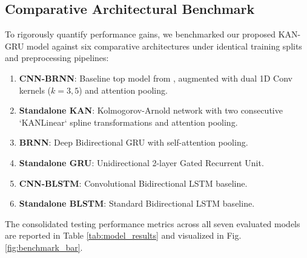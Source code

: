 \documentclass[conference]{IEEEtran}
\begin{document}
\subsection{Comparative Architectural Benchmark}
To rigorously quantify performance gains, we benchmarked our proposed KAN-GRU model against six comparative architectures under identical training splits and preprocessing pipelines:
\begin{enumerate}
    \item \textbf{CNN-BRNN}: Baseline top model from \cite{ieee11308890}, augmented with dual 1D Conv kernels ($k=3, 5$) and attention pooling.
    \item \textbf{Standalone KAN}: Kolmogorov-Arnold network with two consecutive `KANLinear` spline transformations and attention pooling.
    \item \textbf{BRNN}: Deep Bidirectional GRU with self-attention pooling.
    \item \textbf{Standalone GRU}: Unidirectional 2-layer Gated Recurrent Unit.
    \item \textbf{CNN-BLSTM}: Convolutional Bidirectional LSTM baseline.
    \item \textbf{Standalone BLSTM}: Standard Bidirectional LSTM baseline.
\end{enumerate}

The consolidated testing performance metrics across all seven evaluated models are reported in Table \ref{tab:model_results} and visualized in Fig. \ref{fig:benchmark_bar}.

\begin{table}[h]
\centering
\caption{Consolidated Performance Benchmark Across 7 Deep Learning Architectures}
\label{tab:model_results}
\renewcommand{\arraystretch}{1.2}
\end{table}
\end{document}
